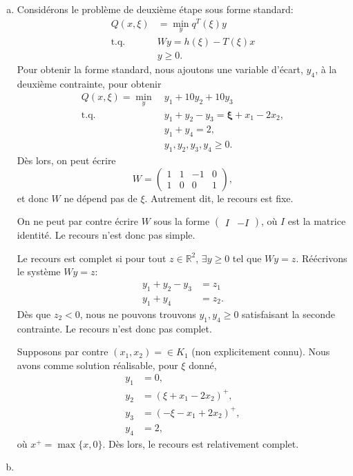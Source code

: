 \documentclass[12pt]{book}
\def\RR {\mathbb{R}}
\def\bxi {\boldsymbol{\xi}}
\def\RR {\mathbb{R}}
\begin{document}
\begin{enumerate}
\begin{enumerate}[(a)]
\item
Considérons le problème de deuxième étape sous forme standard:
\begin{align*}
Q(x,\xi) &= \min_y q^T(\xi)y \\
\mbox{t.q. } & Wy = h(\xi)-T(\xi)x \\
& y \geq 0.
\end{align*}
Pour obtenir la forme standard, nous ajoutons une variable d'écart, $y_4$, à la deuxième contrainte, pour obtenir
\begin{align*}
Q(x,\xi) = \min_y \ & y_1 + 10 y_2 + 10 y_3 \\
\mbox{t.q. } & y_1 + y_2 - y_3 = \bxi + x_1 - 2 x_2,\\
& y_1 + y_4 = 2,\\
&  y_1, y_2, y_3, y_4 \geq 0.
\end{align*}
Dès lors, on peut écrire
$$
W = \begin{pmatrix} 1 & 1 & -1 & 0 \\ 1 & 0 & 0 & 1 \end{pmatrix},
$$
et donc $W$ ne dépend pas de $\xi$. Autrement dit, le recours est fixe.

On ne peut par contre écrire $W$ sous la forme $\begin{pmatrix} I & -I \end{pmatrix}$, où $I$ est la matrice identité. Le recours n'est donc pas simple.

Le recours est complet si pour tout $z \in \RR^2$, $\exists y \geq 0$ tel que $Wy = z$.
Réécrivons le système $Wy = z$:
\begin{align*}
y_1 + y_2 - y_3 &= z_1 \\
y_1 + y_4 &= z_2.
\end{align*}
Dès que $z_2 < 0$, nous ne pouvons trouvons $y_1, y_4 \geq 0$ satisfaisant la seconde contrainte.
Le recours n'est donc pas complet.

Supposons par contre $(x_1, x_2) = \in K_1$ (non explicitement connu). Nous avons comme solution réalisable, pour $\xi$ donné,
\begin{align*}
y_1 &= 0, \\
y_2 &= (\xi + x_1 - 2 x_2)^+, \\
y_3 &= (-\xi - x_1 + 2 x_2)^+, \\
y_4 & = 2,
\end{align*}
où $x^+ = \max \{ x, 0 \}$. Dès lors, le recours est relativement complet.

\item


\end{enumerate}
\end{enumerate}
\end{document}

